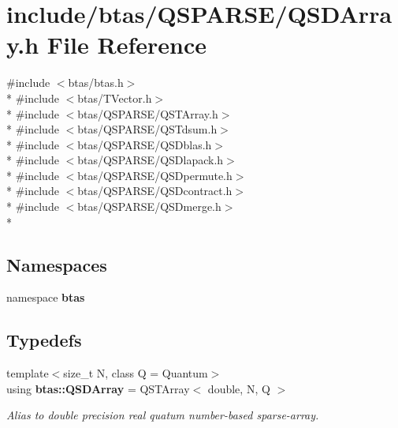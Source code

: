 \section{include/btas/\-Q\-S\-P\-A\-R\-S\-E/\-Q\-S\-D\-Array.h File Reference}
\label{d9/dd2/QSDArray_8h}
{\ttfamily \#include $<$btas/btas.\-h$>$}\\*
{\ttfamily \#include $<$btas/\-T\-Vector.\-h$>$}\\*
{\ttfamily \#include $<$btas/\-Q\-S\-P\-A\-R\-S\-E/\-Q\-S\-T\-Array.\-h$>$}\\*
{\ttfamily \#include $<$btas/\-Q\-S\-P\-A\-R\-S\-E/\-Q\-S\-Tdsum.\-h$>$}\\*
{\ttfamily \#include $<$btas/\-Q\-S\-P\-A\-R\-S\-E/\-Q\-S\-Dblas.\-h$>$}\\*
{\ttfamily \#include $<$btas/\-Q\-S\-P\-A\-R\-S\-E/\-Q\-S\-Dlapack.\-h$>$}\\*
{\ttfamily \#include $<$btas/\-Q\-S\-P\-A\-R\-S\-E/\-Q\-S\-Dpermute.\-h$>$}\\*
{\ttfamily \#include $<$btas/\-Q\-S\-P\-A\-R\-S\-E/\-Q\-S\-Dcontract.\-h$>$}\\*
{\ttfamily \#include $<$btas/\-Q\-S\-P\-A\-R\-S\-E/\-Q\-S\-Dmerge.\-h$>$}\\*
\subsection*{Namespaces}
\begin{DoxyCompactItemize}
\item 
namespace {\bf btas}
\end{DoxyCompactItemize}
\subsection*{Typedefs}
\begin{DoxyCompactItemize}
\item 
{\footnotesize template$<$size\-\_\-t N, class Q  = Quantum$>$ }\\using {\bf btas\-::\-Q\-S\-D\-Array} = Q\-S\-T\-Array$<$ double, N, Q $>$
\begin{DoxyCompactList}\small\item\em Alias to double precision real quatum number-\/based sparse-\/array. \end{DoxyCompactList}\end{DoxyCompactItemize}
